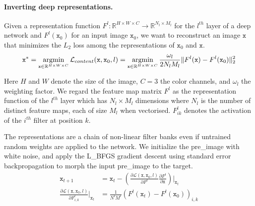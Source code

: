 \documentclass{article}
\begin{document}
\paragraph{Inverting deep representations.}
Given a representation function $F^l: \mathbb{R}^{H \times W \times C} \rightarrow \mathbb{R}^{N_l \times M_l}$ for the $l^{th}$ layer of a deep network and %
 $F^l (\texttt{x}_0)$ for an input image $\texttt{x}_0$,
we want to reconstruct an image $\texttt{x}$ that minimizes the $L_2$ loss among the representations of $\texttt{x}_0$ and $\texttt{x}$. %
\setlength{\belowdisplayskip}{2pt}
\setlength{\abovedisplayskip}{2pt}
\begin{equation}
\texttt{x}^* = \operatornamewithlimits{argmin}_{ \texttt{x} \in \mathbb{R}^{H \times W \times C} } \mathcal{L}_{content} (\texttt{x}, \texttt{x}_0, l) =  \operatornamewithlimits{argmin}_{ \texttt{x} \in \mathbb{R}^{H \times W \times C} } \frac{\omega_l}{2 N_l M_l} \lVert F^l(\texttt{x})- F^l(\texttt{x}_0) \rVert _2^2
\label{eq:contentLoss}
\end{equation}

Here $H$ and $W$ denote the size of the image, $C = 3$ the color channels, and
 $\omega_l$ the weighting factor.
We regard the feature map matrix $F^l$ as the representation function of the $l^{th}$ layer
 which has $N_l \times M_l$ dimensions where $N_l$ is the number of distinct feature maps, each of size $M_l$ when vectorised.
$F_{ik}^l$ denotes the activation of the $i^{th}$ filter at position $k$.


The representations are a chain of non-linear filter banks even if untrained random weights are applied to the network.
We initialize the pre\_image with white noise,
and apply the L\_BFGS gradient descent using standard error backpropagation to morph the input pre\_image to the target.
\setlength{\belowdisplayskip}{2pt}
\setlength{\abovedisplayskip}{2pt}
\begin{align}
 \texttt{x}_{t+1}  &= \texttt{x}_t - \left(\frac{ \partial  \mathcal{L}(\texttt{x},\texttt{x}_0,l) }{ \partial F^l}  \frac{\partial F^l}{\partial \texttt{x}}\right) \bigg|_{\texttt{x}_t}  \\
  \frac{\partial \mathcal{L}(\texttt{x},\texttt{x}_0,l)}{\partial{F^l_{i,k}}}\bigg|_{\texttt{x}_t}  &= \frac{1}{N^l M^l}(F^l(\texttt{x}_t)-F^l(\texttt{x}_0))_{i,k}  %
\end{align}
\end{document}

